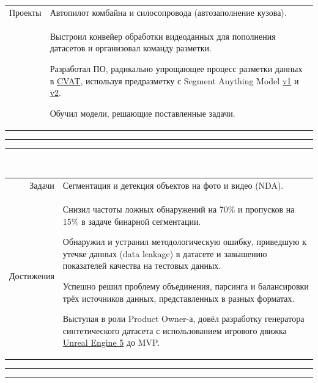 \documentclass[11pt]{article}
\renewenvironment{itemize}{
	\begin{list}{\labelitemi}{
			\setlength{\topsep   }{0pt}
			\setlength{\partopsep}{0pt}
			\setlength{\parskip  }{0pt}
			\setlength{\parsep   }{0pt}
			\setlength{\itemsep  }{0pt}
		}
	}{\end{list}}
\begin{document}
		\vspace{0.9em}\\
		\\
		\begin{tabular} {r|p{}}
			Проекты & Автопилот комбайна и силосопровода (автозаполнение кузова).\\
			\noindent{Достижения} & 
			\begin{itemize}
				\item Выстроил конвейер обработки видеоданных для пополнения датасетов и организовал команду разметки.
				\item Разработал ПО, радикально упрощающее процесс разметки данных в \href{https://www.cvat.ai/}{CVAT}, используя предразметку с Segment Anything Model \href{https://segment-anything.com/}{v1} и  \href{https://sam2.metademolab.com/demo}{v2}.
				\item Обучил модели, решающие поставленные задачи.
			\end{itemize}
		\end{tabular}
		\vspace{0.3em}\hrule\vspace{0.1em}\hrule\vspace{0.5em}
		
		\\
		\begin{tabular} {r | p{}}
			Задачи & Сегментация и детекция объектов на фото и видео (NDA).\\
			Достижения &
			\begin{itemize}
				\item Снизил частоты ложных обнаружений на 70\% и пропусков на 15\% в задаче бинарной сегментации.
				\item Обнаружил и устранил методологическую ошибку, приведшую к утечке данных (data leakage) в датасете и завышению показателей качества на тестовых данных.
				\item Успешно решил проблему объединения, парсинга и балансировки трёх источников данных, представленных в разных форматах.
				\item Выступая в роли Product Owner-а, довёл разработку генератора синтетического датасета с использованием игрового движка \href{https://www.unrealengine.com/en-US/unreal-engine-5}{Unreal Engine 5} до MVP.
			\end{itemize}
		\end{tabular}
		\vspace{0.3em}\hrule\vspace{0.1em}\hrule\vspace{0.5em}
		
\end{document}
